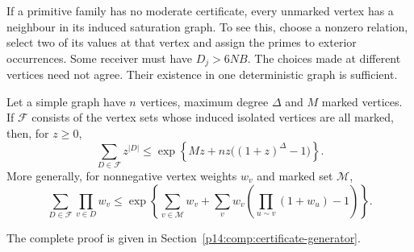 If a primitive family has no moderate certificate, every unmarked
vertex has a neighbour in its induced saturation graph. To see this,
choose a nonzero relation, select two of its values at that vertex and
assign the primes to exterior occurrences. Some receiver must have
$D_j>6NB$. The choices made at different vertices need not agree.
Their existence in one deterministic graph is sufficient.

\begin{lemma}
\label{p1:core:generator}
Let a simple graph have $n$ vertices, maximum degree $\Delta$ and
$M$ marked vertices. If $\mathcal F$ consists of the vertex sets
whose induced isolated vertices are all marked, then, for $z\ge0$,
\begin{equation}
 \sum_{D\in\mathcal F}z^{|D|}
 \le\exp\left\{Mz+nz\bigl((1+z)^\Delta-1\bigr)\right\}.
 \label{p1:core:generator-bound}
\end{equation}
More generally, for nonnegative vertex weights $w_v$ and marked set
$\mathcal M$,
\[
 \sum_{D\in\mathcal F}\prod_{v\in D}w_v
 \le \exp\left\{\sum_{v\in\mathcal M}w_v+
 \sum_vw_v\left(\prod_{u\sim v}(1+w_u)-1\right)\right\}.
\]
\end{lemma}
\noindent The complete proof is given in Section~\ref{p14:comp:certificate-generator}.
